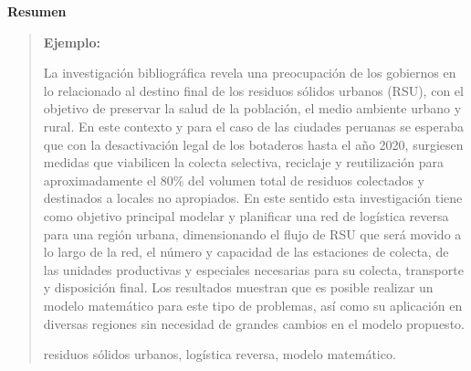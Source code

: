 





\newpage
\begin{center}
 {\bf\LARGE Resumen}
\end{center} 
\vskip 0.5cm
\begin{quotation}
{\bf Ejemplo:}\par

La investigación bibliográfica revela una preocupación de los gobiernos en lo relacionado al destino final de los residuos sólidos urbanos (RSU), con el objetivo de preservar la salud de la población, el medio ambiente urbano y rural. En este contexto y para el caso de las ciudades peruanas se esperaba que con la desactivación legal de los botaderos hasta el año 2020, surgiesen medidas que viabilicen la colecta selectiva, reciclaje y reutilización para aproximadamente el $80\%$ del volumen total de residuos colectados y destinados a locales no apropiados. 
\vskip 0.2cm 
En este sentido esta investigación tiene como objetivo principal modelar y planificar una red de logística reversa para una región urbana, dimensionando el flujo de RSU que será movido a lo largo de la red, el número y capacidad de las estaciones de colecta, de las unidades productivas y especiales necesarias para su colecta, transporte y disposición final. Los resultados muestran que es posible realizar un modelo matemático para este tipo de problemas, así como su aplicación en diversas regiones sin necesidad de grandes cambios en el modelo propuesto.    

\vskip 0.3cm
\hspace*{-0.6cm}{\bf Palabras claves:} residuos sólidos urbanos, logística reversa, modelo matemático.
\end{quotation}


